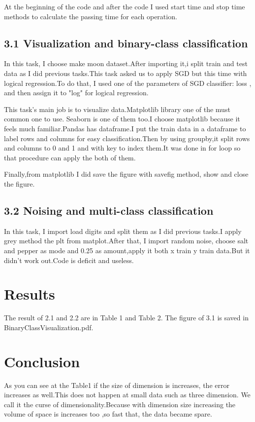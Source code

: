 \documentclass[onecolumn]{article}
\begin{document}
At the beginning of the code and after the code I used start time and stop time methods to calculate the passing time for each operation.


\subsection*{3.1 Visualization and binary-class classification} %
In this task, I choose make moon dataset.After importing it,i split train and test data as I did previous tasks.This task asked us to apply SGD  but this time with logical regression.To do that, I used one of the parameters of SGD classifier: loss , and then assign it to "log" for logical regression.

This task's main job is to visualize data.Matplotlib library one of the must common one to use. Seaborn is one of them too.I choose matplotlib because it feels much familiar.Pandas has dataframe.I put the train data in a dataframe to label rows and columns for easy classification.Then by using groupby,it split rows and columns to 0 and 1 and with key to index them.It was done in for loop so that procedure can apply the both of them.

Finally,from matplotlib I did save the figure with savefig method, show and close the figure.

\subsection*{3.2 Noising and multi-class classification} %
In this task, I import load digits and split them as I did previous tasks.I apply grey method the plt from matplot.After that, I import random noise, choose salt and pepper as mode and 0.25 as amount,apply it both x train y train data.But it didn't work out.Code is deficit and useless.


\section{Results}

The result of 2.1 and 2.2 are in Table 1 and Table 2. The figure of 3.1 is saved in BinaryClassVisualization.pdf.


\section{Conclusion}
As you can see at the Table1 if the size of dimension is increases, the error increases as well.This
does not happen at small data such as three dimension. We call it the curse of dimensionality.Because with dimension size increasing the volume of space is increases too ,so fast that, the data became spare.
\end{document}
